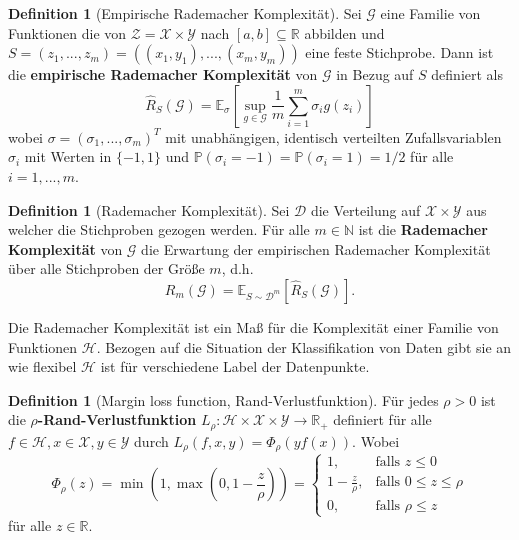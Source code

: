 \documentclass{article}
\theoremstyle{plain}
\theoremstyle{definition}
\newtheorem{dfn}[thm]{Definition}
\begin{document}
    \begin{dfn}[Empirische Rademacher Komplexität]
        Sei $\mathcal{G}$ eine Familie von Funktionen die von $\mathcal{Z} = \mathcal{X} \times \mathcal{Y}$ nach $[a,b] \subseteq \mathbb{R}$ abbilden und $S = (z_{1},...,z_{m}) = ((x_{1},y_{1}),...,(x_{m},y_{m}))$ eine feste Stichprobe. Dann ist die \textbf{empirische Rademacher Komplexität} von $\mathcal{G}$ in Bezug auf $S$ definiert als
        \[
            \hat{R}_{S}(\mathcal{G}) = \mathbb{E}_{\sigma}\left[\sup_{g \in \mathcal{G}} \frac{1}{m} \sum_{i = 1}^{m} \sigma_{i} g(z_{i})\right]
        \]
        wobei $\sigma = (\sigma_{1},...,\sigma_{m})^{T}$ mit unabhängigen, identisch verteilten Zufallsvariablen $\sigma_{i}$ mit Werten in $\{-1,1\}$ und $\mathbb{P}(\sigma_{i} = -1) = \mathbb{P}(\sigma_{i} = 1) = 1/2$ für alle $i = 1,...,m$.
    \end{dfn}
    
    \begin{dfn}[Rademacher Komplexität]
        Sei $\mathcal{D}$ die Verteilung auf $\mathcal{X} \times \mathcal{Y}$ aus welcher die Stichproben gezogen werden. Für alle $m \in \mathbb{N}$ ist die \textbf{Rademacher Komplexität} von $\mathcal{G}$ die Erwartung der empirischen Rademacher Komplexität über alle Stichproben der Größe $m$, d.h.
        \[
            R_{m}(\mathcal{G}) = \mathbb{E}_{S \sim \mathcal{D}^{m}}[\hat{R}_{S}(\mathcal{G})].
        \]
    \end{dfn}
    
    Die Rademacher Komplexität ist ein Maß für die Komplexität einer Familie von Funktionen $\mathcal{H}$. Bezogen auf die Situation der Klassifikation von Daten gibt sie an wie flexibel $\mathcal{H}$ ist für verschiedene Label der Datenpunkte.
    

    \begin{dfn}[Margin loss function, Rand-Verlustfunktion]
        Für jedes $\rho > 0$ ist die \textbf{$\rho$-Rand-Verlustfunktion} $L_{\rho}: \mathcal{H} \times \mathcal{X} \times \mathcal{Y} \to \mathbb{R}_{+}$ definiert für alle $f \in \mathcal{H}, x \in \mathcal{X}, y \in \mathcal{Y}$ durch $L_{\rho}(f,x,y) = \Phi_{\rho}(y f(x))$. Wobei
        \[
            \Phi_{\rho}(z)
            =
            \min(1, \max(0, 1 - \frac{z}{\rho}))
            =
            \begin{cases}
                1, & \text{falls } z \leq 0 \\
                1 - \frac{z}{\rho}, &\text{falls } 0 \leq z \leq \rho \\
                0, &\text{falls } \rho \leq z
            \end{cases}
        \]
        für alle $z \in \mathbb{R}$.
    \end{dfn}
    
\end{document}

